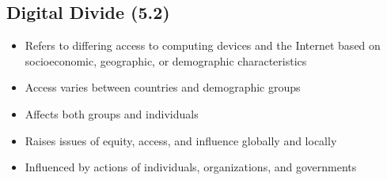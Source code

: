 

\subsection*{Digital Divide (5.2)}

\begin{itemize}
    \item Refers to differing access to computing devices and the Internet based on socioeconomic, geographic, or demographic characteristics %
    \item Access varies between countries and demographic groups %
    \item Affects both groups and individuals %
    \item Raises issues of equity, access, and influence globally and locally %
    \item Influenced by actions of individuals, organizations, and governments %
\end{itemize}

